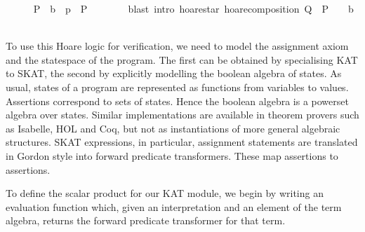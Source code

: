 \documentclass{llncs}
\begin{document}
\begin{isabellebody}
\ \ \ \ \isamarkupfalse%
\ {}P\ {}\ {}b\ {}\ p{}\ {}\ P{}\isanewline
\ \ \ \ \ \ \isamarkupfalse%
\ {}blast\ intro{}\ hoare{}star\ hoare{}composition{}\ {}Q\ {}\ {}P\ {}\ {}\ {}\ b{}{}{}\isanewline
\ \ \isamarkupfalse%
%
\endisatagproof
\end{isabellebody}

To use this Hoare logic for verification, we need to model the
assignment axiom and the statespace of the program. The first can be
obtained by specialising KAT to SKAT, the second by explicitly
modelling the boolean algebra of states. As usual, states of a program
are represented as functions from variables to values. Assertions
correspond to sets of states. Hence the boolean algebra is a powerset
algebra over states. Similar implementations are available in theorem
provers such as Isabelle, HOL and Coq, but not as instantiations of
more general algebraic structures. SKAT expressions, in particular,
assignment statements are translated in Gordon style into forward
predicate transformers. These map assertions to assertions.

To define the scalar product for our KAT module, we begin by writing
an evaluation function which, given an interpretation and an element of
the term algebra, returns the forward predicate transformer for that
term.
\end{document}
